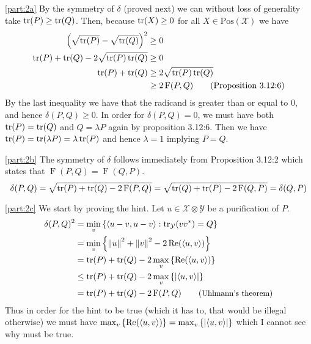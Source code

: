\documentclass[boxes,pages,color=SeaGreen]{homework}
\newcommand{\X}{\mathcal{X}}
\newcommand{\Y}{\mathcal{Y}}
\newcommand{\Fid}{\operatorname{F}}
\newcommand{\Pos}{\mathrm{Pos}}
\begin{document}
\begin{solution}
    \ref{part:2a}
    By the symmetry of $\delta$ (proved next) we can without loss of generality take $\tr(P)\geq \tr(Q)$.
    Then, because $\tr(X) \geq 0$ for all $X\in\Pos(\X)$ we have
    \begin{align*}
        \qty(\sqrt{\tr(P)} - \sqrt{\tr(Q)})^2  & \geq 0                                    \\
        \tr(P) + \tr(Q) - 2\sqrt{\tr(P)\tr(Q)} & \geq 0                                    \\
        \tr(P) + \tr(Q)                        & \geq 2\sqrt{\tr(P)\tr(Q)}                 \\
                                               & \geq 2\Fid(P, Q) \tag{Proposition 3.12:6}
    \end{align*}
    By the last inequality we have that the radicand is greater than or equal to 0, and hence $\delta(P, Q) \geq 0$.
    In order for $\delta(P, Q) = 0$, we must have both $\tr(P) = \tr(Q)$ and $Q = \lambda P$ again by proposition 3.12:6.
    Then we have $\tr(P) = \tr(\lambda P) = \lambda \tr(P)$ and hence $\lambda = 1$ implying $P = Q$.

    \ref{part:2b}
    The symmetry of $\delta$ follows immediately from Proposition 3.12:2 which states that $\Fid(P, Q) = \Fid(Q, P)$.
    \begin{equation*}
        \delta(P, Q) = \sqrt{\tr(P) + \tr(Q) - 2\Fid(P, Q)} = \sqrt{\tr(Q) + \tr(P) - 2\Fid(Q, P)} = \delta(Q, P)
    \end{equation*}

    \ref{part:2c}
    We start by proving the hint.
    Let $u\in\X\otimes\Y$ be a purification of $P$.
    \begin{align*}
        \delta(P, Q)^2 & = \min_v\qty{\langle u - v, u - v\rangle: \tr_\Y(vv^*) = Q}        \\
                       & = \min_v \qty{\norm{u}^2 + \norm{v}^2 - 2\Re(\langle u, v\rangle)} \\
                       & = \tr(P) + \tr(Q) - 2\max_v\qty{\Re(\langle u, v\rangle)}          \\
                       & \leq \tr(P) + \tr(Q) - 2\max_v\qty{\abs{\langle u, v\rangle}}      \\
                       & = \tr(P) + \tr(Q) - 2\Fid(P, Q) \tag{\small Uhlmann's theorem}
    \end{align*}
    Thus in order for the hint to be true (which it has to, that would be illegal otherwise) we must have $\max_v\qty{\Re(\langle u, v\rangle)} = \max_v\qty{\abs{\langle u, v \rangle}}$ which I cannot see why must be true.


\end{solution}
\end{document}
